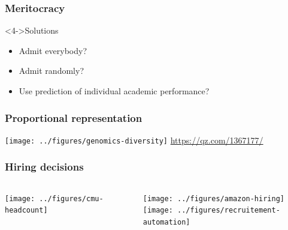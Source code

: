 \documentclass{beamer}
\begin{document}
\begin{frame}
  \frametitle{Meritocracy}
  
  \begin{block}<4->{Solutions}
    \begin{itemize}
    \item<5-> Admit \alert{everybody}?
    \item<6-> Admit \alert{randomly}?
    \item<7-> Use \alert{prediction} of individual academic performance?
    \end{itemize}
  \end{block}
  


\end{frame}

\begin{frame}
  \frametitle{Proportional representation}
  \texttt{[image: ../figures/genomics-diversity]}
  \url{https://qz.com/1367177/}
\end{frame}



\begin{frame}
  \frametitle{Hiring decisions}
  \begin{columns}
    \begin{column}{0.5\textwidth}
      \texttt{[image: ../figures/cmu-headcount]}
    \end{column}
    \begin{column}{0.5\textwidth}
      \texttt{[image: ../figures/amazon-hiring]}
      \\
      \texttt{[image: ../figures/recruitement-automation]}
    \end{column}
  \end{columns}
\end{frame}
\end{document}
